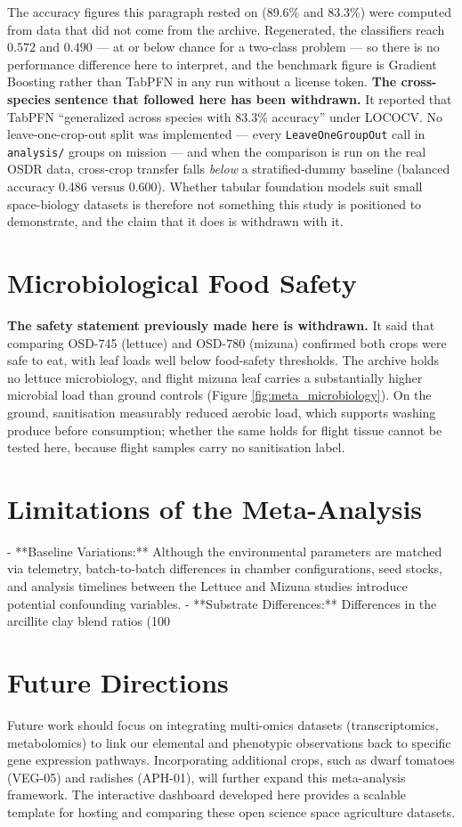 The accuracy figures this paragraph rested on (89.6\% and 83.3\%) were computed
from data that did not come from the archive. Regenerated, the classifiers reach
$0.572$ and $0.490$ --- at or below chance for a two-class problem --- so there
is no performance difference here to interpret, and the benchmark figure is
Gradient Boosting rather than TabPFN in any run without a license token.
\textbf{The cross-species sentence that followed here has been withdrawn.} It
reported that TabPFN ``generalized across species with 83.3\% accuracy'' under
LOCOCV. No leave-one-crop-out split was implemented --- every
\texttt{LeaveOneGroupOut} call in \texttt{analysis/} groups on mission --- and
when the comparison is run on the real OSDR data, cross-crop transfer falls
\emph{below} a stratified-dummy baseline (balanced accuracy 0.486 versus 0.600).
Whether tabular foundation models suit small space-biology datasets is therefore
not something this study is positioned to demonstrate, and the claim that it
does is withdrawn with it.

\section{Microbiological Food Safety}
\textbf{The safety statement previously made here is withdrawn.} It said that
comparing OSD-745 (lettuce) and OSD-780 (mizuna) confirmed both crops were safe
to eat, with leaf loads well below food-safety thresholds. The archive holds no
lettuce microbiology, and flight mizuna leaf carries a substantially higher
microbial load than ground controls (Figure \ref{fig:meta_microbiology}). On the
ground, sanitisation measurably reduced aerobic load, which supports washing
produce before consumption; whether the same holds for flight tissue cannot be
tested here, because flight samples carry no sanitisation label.

\section{Limitations of the Meta-Analysis}
- **Baseline Variations:** Although the environmental parameters are matched via telemetry, batch-to-batch differences in chamber configurations, seed stocks, and analysis timelines between the Lettuce and Mizuna studies introduce potential confounding variables.
- **Substrate Differences:** Differences in the arcillite clay blend ratios (100%

\section{Future Directions}
Future work should focus on integrating multi-omics datasets (transcriptomics, metabolomics) to link our elemental and phenotypic observations back to specific gene expression pathways. Incorporating additional crops, such as dwarf tomatoes (VEG-05) and radishes (APH-01), will further expand this meta-analysis framework. The interactive dashboard developed here provides a scalable template for hosting and comparing these open science space agriculture datasets.
